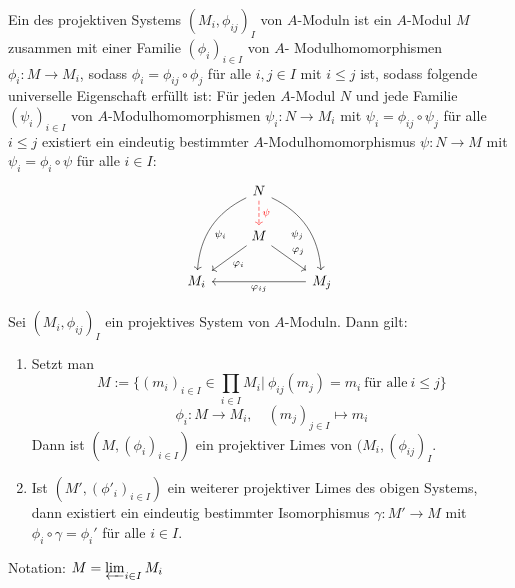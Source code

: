 \begin{df} \label{16.20}
		Ein  des projektiven Systems $(M_i, \phi_{ij})_I$ von $A$-Moduln ist ein $A$-Modul $M$ zusammen mit einer Familie $(\phi_i)_{i\in I}$ von $A$- Modulhomomorphismen $\phi_i:M \to M_i$, sodass $\phi_i = \phi_{ij} \circ \phi_j$ für alle $i,j\in I$ mit $i\leq j$ ist, sodass folgende universelle Eigenschaft erfüllt ist: Für jeden $A$-Modul $N$ und jede Familie $(\psi_i)_{i\in I}$ von $A$-Modulhomomorphismen $\psi_i :N \to M_i$ mit $\psi_i = \phi_{ij} \circ \psi_j$ für alle $i\leq j$ existiert ein eindeutig bestimmter $A$-Modulhomomorphismus $\psi:N \to M$ mit $\psi_i = \phi_i \circ \psi$ für alle $i\in I$:
	$$\begin{tikzcd}
	& N \arrow[dashed, red]{d}{\psi} \arrow[bend right]{ddl}{\psi_i} \arrow[bend left, swap]{ddr}{\psi_j}& \\ 
	& M \arrow{dl}{\phi_i} \arrow{dr}{\phi_j}& \\
	M_i  & & M_j  \arrow{ll}{\phi_{ij}}
	\end{tikzcd}$$
\end{df}
\begin{sa} \label{16.21}
	Sei $(M_i,\phi_{ij})_I $ ein projektives System von $A$-Moduln. Dann gilt: 
	\begin{enumerate} [label = \alph*)]
		\item Setzt man $$ M:= \{(m_i)_{i \in I} \in \prod_{i\in I}M_i| \ \phi_{ij}(m_j)=m_i \ \text{für alle} \ i \leq j\} $$ $$\phi_i: M \to M_i, \quad (m_j)_{j\in I} \mapsto m_i $$
		Dann ist $(M, (\phi_i)_{i \in I }) $ ein projektiver Limes von $(M_i,(\phi_{ij})_I$.
		\item Ist $(M',(\phi'_i)_{i \in I})$ ein weiterer projektiver Limes des obigen Systems, dann existiert ein eindeutig bestimmter Isomorphismus $\gamma: M' \to M $ mit $\phi_i \circ \gamma = \phi_i'$ für alle $i \in I $.
	\end{enumerate}
	Notation: $M = \varprojlim_{i\in I} M_i$ 
\end{sa}
